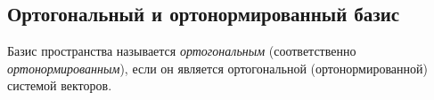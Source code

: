 \begin{comment}
    Всякая ортогональная (и в частности ортонормированная) система векторов автоматически линейно независима.
    \begin{equation*}
        \det G(v_1, \dots, v_k) = |v_1|^2 \dots |v_k|^2 \neq 0
    .\end{equation*}
\end{comment}


\subsection{Ортогональный и ортонормированный базис}

\begin{definition}
    Базис пространства называется \textit{ортогональным} (соответственно \textit{ортонормированным}), если он является ортогональной (ортонормированной) системой векторов.
\end{definition}
